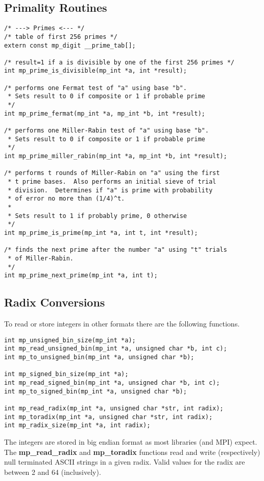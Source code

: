 \documentclass[]{article}
\begin{document}
\subsection{Primality Routines}
\begin{verbatim}
/* ---> Primes <--- */
/* table of first 256 primes */
extern const mp_digit __prime_tab[];

/* result=1 if a is divisible by one of the first 256 primes */
int mp_prime_is_divisible(mp_int *a, int *result);

/* performs one Fermat test of "a" using base "b".  
 * Sets result to 0 if composite or 1 if probable prime 
 */
int mp_prime_fermat(mp_int *a, mp_int *b, int *result);

/* performs one Miller-Rabin test of "a" using base "b".
 * Sets result to 0 if composite or 1 if probable prime 
 */
int mp_prime_miller_rabin(mp_int *a, mp_int *b, int *result);

/* performs t rounds of Miller-Rabin on "a" using the first
 * t prime bases.  Also performs an initial sieve of trial
 * division.  Determines if "a" is prime with probability
 * of error no more than (1/4)^t.
 *
 * Sets result to 1 if probably prime, 0 otherwise
 */
int mp_prime_is_prime(mp_int *a, int t, int *result);

/* finds the next prime after the number "a" using "t" trials
 * of Miller-Rabin.
 */
int mp_prime_next_prime(mp_int *a, int t);
\end{verbatim}

\subsection{Radix Conversions}
To read or store integers in other formats there are the following functions.

\begin{verbatim}
int mp_unsigned_bin_size(mp_int *a);
int mp_read_unsigned_bin(mp_int *a, unsigned char *b, int c);
int mp_to_unsigned_bin(mp_int *a, unsigned char *b);

int mp_signed_bin_size(mp_int *a);
int mp_read_signed_bin(mp_int *a, unsigned char *b, int c);
int mp_to_signed_bin(mp_int *a, unsigned char *b);

int mp_read_radix(mp_int *a, unsigned char *str, int radix);
int mp_toradix(mp_int *a, unsigned char *str, int radix);
int mp_radix_size(mp_int *a, int radix);
\end{verbatim}

The integers are stored in big endian format as most libraries (and MPI) expect.  The \textbf{mp\_read\_radix} and 
\textbf{mp\_toradix} functions read and write (respectively) null terminated ASCII strings in a given radix.  Valid values
for the radix are between 2 and 64 (inclusively).  
\end{document}

